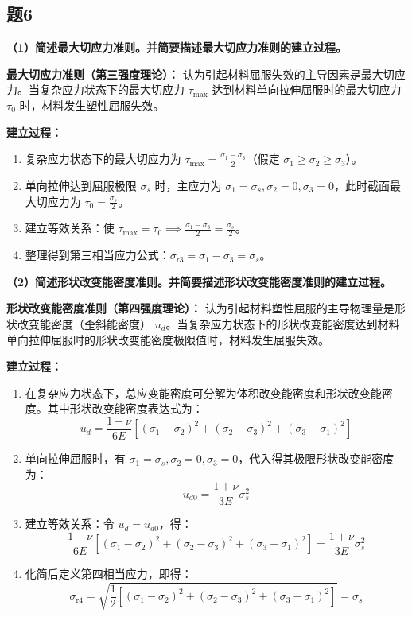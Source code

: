 \documentclass[11pt,a4paper]{ctexrep}
\begin{document}
{\subsection*{题6}
\textbf{（1）简述最大切应力准则。并简要描述最大切应力准则的建立过程。}

\textbf{最大切应力准则（第三强度理论）：}
认为引起材料屈服失效的主导因素是最大切应力。当复杂应力状态下的最大切应力 $\tau_{\text{max}}$ 达到材料单向拉伸屈服时的最大切应力 $\tau_0$ 时，材料发生塑性屈服失效。

\textbf{建立过程：}
\begin{enumerate}
    \item 复杂应力状态下的最大切应力为 $\tau_{\text{max}} = \frac{\sigma_1 - \sigma_3}{2}$（假定 $\sigma_1 \ge \sigma_2 \ge \sigma_3$）。
    \item 单向拉伸达到屈服极限 $\sigma_s$ 时，主应力为 $\sigma_1 = \sigma_s, \sigma_2 = 0, \sigma_3 = 0$，此时截面最大切应力为 $\tau_0 = \frac{\sigma_s}{2}$。
    \item 建立等效关系：使 $\tau_{\text{max}} = \tau_0 \implies \frac{\sigma_1 - \sigma_3}{2} = \frac{\sigma_s}{2}$。
    \item 整理得到第三相当应力公式：$\sigma_{\text{r3}} = \sigma_1 - \sigma_3 = \sigma_s$。
\end{enumerate}

\textbf{（2）简述形状改变能密度准则。并简要描述形状改变能密度准则的建立过程。}

\textbf{形状改变能密度准则（第四强度理论）：}
认为引起材料塑性屈服的主导物理量是形状改变能密度（歪斜能密度） $u_d$。当复杂应力状态下的形状改变能密度达到材料单向拉伸屈服时的形状改变能密度极限值时，材料发生屈服失效。

\textbf{建立过程：}
\begin{enumerate}
    \item 在复杂应力状态下，总应变能密度可分解为体积改变能密度和形状改变能密度。其中形状改变能密度表达式为：
          \[
              u_d = \frac{1+\nu}{6E} \left[ (\sigma_1 - \sigma_2)^2 + (\sigma_2 - \sigma_3)^2 + (\sigma_3 - \sigma_1)^2 \right]
          \]
    \item 单向拉伸屈服时，有 $\sigma_1 = \sigma_s, \sigma_2 = 0, \sigma_3 = 0$，代入得其极限形状改变能密度为：
          \[
              u_{d0} = \frac{1+\nu}{3E} \sigma_s^2
          \]
    \item 建立等效关系：令 $u_d = u_{d0}$，得：
          \[
              \frac{1+\nu}{6E} \left[ (\sigma_1 - \sigma_2)^2 + (\sigma_2 - \sigma_3)^2 + (\sigma_3 - \sigma_1)^2 \right] = \frac{1+\nu}{3E} \sigma_s^2
          \]
    \item 化简后定义第四相当应力，即得：
          \[
              \sigma_{\text{r4}} = \sqrt{\frac{1}{2} \left[ (\sigma_1 - \sigma_2)^2 + (\sigma_2 - \sigma_3)^2 + (\sigma_3 - \sigma_1)^2 \right]} = \sigma_s
          \]
\end{enumerate}

}
\end{document}
